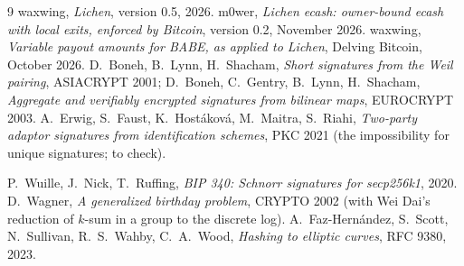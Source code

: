 \documentclass[11pt]{article}
\theoremstyle{plain}
\theoremstyle{definition}
\begin{document}
\begin{thebibliography}{9}
 waxwing, \emph{Lichen}, version 0.5, 2026.
 m0wer, \emph{Lichen ecash: owner-bound ecash with local
  exits, enforced by Bitcoin}, version 0.2, November 2026.
 waxwing, \emph{Variable payout amounts for BABE, as
  applied to Lichen}, Delving Bitcoin, October 2026.
 D.~Boneh, B.~Lynn, H.~Shacham, \emph{Short signatures from
  the Weil pairing}, ASIACRYPT 2001; D.~Boneh, C.~Gentry, B.~Lynn,
  H.~Shacham, \emph{Aggregate and verifiably encrypted signatures from
  bilinear maps}, EUROCRYPT 2003.
 A.~Erwig, S.~Faust, K.~Hostáková, M.~Maitra, S.~Riahi,
  \emph{Two-party adaptor signatures from identification schemes}, PKC
  2021 (the impossibility for unique signatures; to check).

 P.~Wuille, J.~Nick, T.~Ruffing, \emph{BIP 340: Schnorr
  signatures for secp256k1}, 2020.
 D.~Wagner, \emph{A generalized birthday problem},
  CRYPTO 2002 (with Wei Dai's reduction of $k$-sum in a group to the
  discrete log).
 A.~Faz-Hern\'andez, S.~Scott, N.~Sullivan,
  R.~S.~Wahby, C.~A.~Wood, \emph{Hashing to elliptic curves}, RFC 9380,
  2023.
\end{thebibliography}
\end{document}
